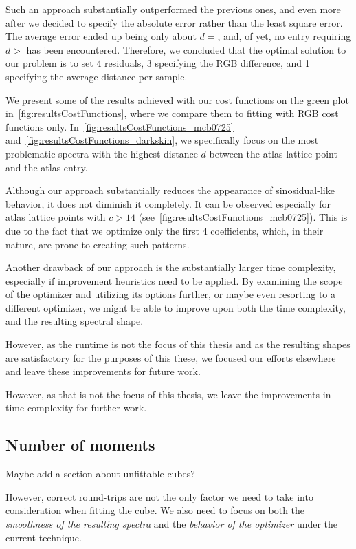 Such an approach substantially outperformed the previous ones, and even more after we decided to specify the absolute error rather than the least square error. The average error ended up being only about $d = $, and, of yet, no entry requiring $d > $ has been encountered. Therefore, we concluded that the optimal solution to our problem is to set 4 residuals, 3 specifying the RGB difference, and 1 specifying the average distance per sample.

We present some of the results achieved with our cost functions on the green plot in~\cref{fig:resultsCostFunctions}, where we compare them to fitting with RGB cost functions only. In~\cref{fig:resultsCostFunctions_mcb0725} and~\cref{fig:resultsCostFunctions_darkskin}, we specifically focus on the most problematic spectra with the highest distance $d$ between the atlas lattice point and the atlas entry.

Although our approach substantially reduces the appearance of sinosidual-like behavior, it does not diminish it completely. It can be observed especially for atlas lattice points with $c > 14$ (see~\cref{fig:resultsCostFunctions_mcb0725}). This is due to the fact that we optimize only the first 4 coefficients, which, in their nature, are prone to creating such patterns.

Another drawback of our approach is the substantially larger time complexity, especially if improvement heuristics need to be applied. By examining the scope of the optimizer and utilizing its options further, or maybe even resorting to a different optimizer, we might be able to improve upon both the time complexity, and the resulting spectral shape.

However, as the runtime is not the focus of this thesis and as the resulting shapes are satisfactory for the purposes of this these, we focused our efforts elsewhere and leave these improvements for future work.

 However, as that is not the focus of this thesis, we leave the improvements in time complexity for further work.


\subsection{Number of moments}
 
Maybe add a section about unfittable cubes?

However, correct round-trips are not the only factor we need to take into consideration when fitting the cube. We also need to focus on both the \emph{smoothness of the resulting spectra} and the \emph{behavior of the optimizer} under the current technique.

